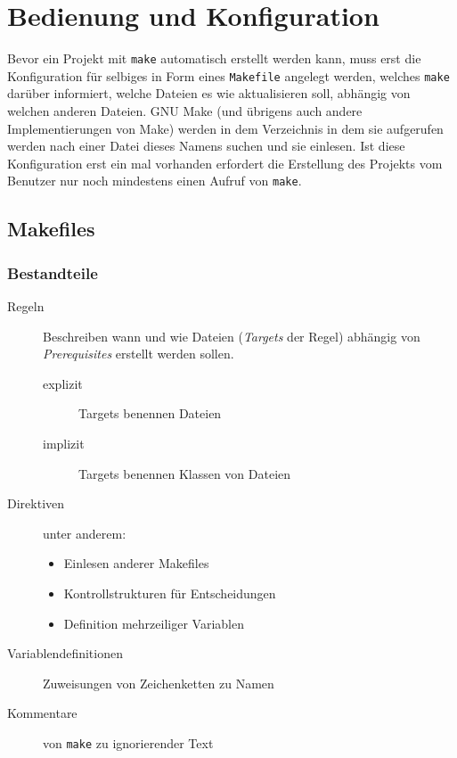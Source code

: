 \section{Bedienung und Konfiguration} 

Bevor ein Projekt mit \texttt{make} automatisch erstellt werden kann, muss erst
die Konfiguration für selbiges in Form eines \texttt{Makefile} angelegt werden,
welches \texttt{make} darüber informiert, welche Dateien es wie aktualisieren
soll, abhängig von welchen anderen Dateien. GNU Make (und übrigens auch andere
Implementierungen von Make) werden in dem Verzeichnis in dem sie aufgerufen
werden nach einer Datei dieses Namens suchen und sie einlesen.
%
Ist diese Konfiguration erst ein mal vorhanden erfordert die Erstellung des
Projekts vom Benutzer nur noch mindestens einen Aufruf von \texttt{make}.

\subsection{Makefiles}

\subsubsection{Bestandteile} 

\begin{description}
%
	\item[Regeln] Beschreiben wann und wie Dateien (\emph{Targets} der Regel)
	abhängig von \emph{Prerequisites} erstellt werden sollen.
	\begin{description}
		\item[explizit] Targets benennen Dateien
		\item[implizit] Targets benennen Klassen von Dateien
	\end{description}
%
	\item[Direktiven] unter anderem:
	\begin{itemize}
		\item Einlesen anderer Makefiles
		\item Kontrollstrukturen für Entscheidungen
		\item Definition mehrzeiliger Variablen
	\end{itemize}
%
	\item[Variablendefinitionen] Zuweisungen von Zeichenketten zu Namen
%
	\item[Kommentare] von \texttt{make} zu ignorierender Text
\end{description}
